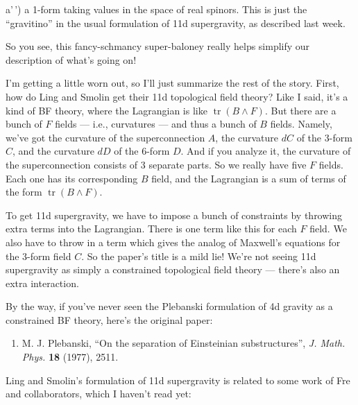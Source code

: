 \documentclass{article}
\def\tightlist{}
\renewcommand{\texttt}[1]{%
  \begingroup
  \ttfamily
  \begingroup\lccode`~=`/\lowercase{\endgroup\def~}{/\discretionary{}{}{}}%
  \begingroup\lccode`~=`[\lowercase{\endgroup\def~}{[\discretionary{}{}{}}%
  \begingroup\lccode`~=`.\lowercase{\endgroup\def~}{.\discretionary{}{}{}}%
  \catcode`/=\active\catcode`[=\active\catcode`.=\active
  \scantokens{#1\noexpand}%
  \endgroup
}
\begin{document}
a'\,') a 1-form taking values in the space of real spinors. This is just
the ``gravitino'' in the usual formulation of 11d supergravity, as
described last week.

So you see, this fancy-schmancy super-baloney really helps simplify our
description of what's going on!

I'm getting a little worn out, so I'll just summarize the rest of the
story. First, how do Ling and Smolin get their 11d topological field
theory? Like I said, it's a kind of BF theory, where the Lagrangian is
like \(\operatorname{tr}(B\wedge F)\). But there are a bunch of \(F\)
fields --- i.e., curvatures --- and thus a bunch of \(B\) fields.
Namely, we've got the curvature of the superconnection \(A\), the
curvature \(dC\) of the 3-form \(C\), and the curvature \(dD\) of the
6-form \(D\). And if you analyze it, the curvature of the
superconnection consists of 3 separate parts. So we really have five
\(F\) fields. Each one has its corresponding \(B\) field, and the
Lagrangian is a sum of terms of the form
\(\operatorname{tr}(B\wedge F)\).

To get 11d supergravity, we have to impose a bunch of constraints by
throwing extra terms into the Lagrangian. There is one term like this
for each \(F\) field. We also have to throw in a term which gives the
analog of Maxwell's equations for the 3-form field \(C\). So the paper's
title is a mild lie! We're not seeing 11d supergravity as simply a
constrained topological field theory --- there's also an extra
interaction.

By the way, if you've never seen the Plebanski formulation of 4d gravity
as a constrained BF theory, here's the original paper:

\begin{enumerate}
\def\labelenumi{\arabic{enumi})}
\setcounter{enumi}{1}
\tightlist
\item
  M. J. Plebanski, ``On the separation of Einsteinian substructures'',
  \emph{J. Math. Phys.} \textbf{18} (1977), 2511.
\end{enumerate}

Ling and Smolin's formulation of 11d supergravity is related to some
work of Fre and collaborators, which I haven't read yet:

\end{document}
